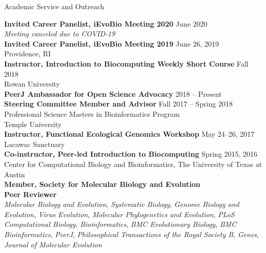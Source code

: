 \documentclass{resume} %
\begin{document}
\vspace*{0.5cm}

\vspace*{0.5cm}
\begin{rSection}{Academic Service and Outreach}
\vspace*{0.25cm}

\textbf{Invited Career Panelist, iEvoBio Meeting 2020} \hfill June 2020 \\ \emph{Meeting canceled due to COVID-19} \\

\textbf{Invited Career Panelist, iEvoBio Meeting 2019} \hfill June 26, 2019 \\ Providence, RI \\

\textbf{Instructor, Introduction to Biocomputing Weekly Short Course} \hfill Fall 2018 \\ Rowan University \\

\textbf{PeerJ Ambassador for Open Science Advocacy} \hfill 2018 -- Present \\

\textbf{Steering Committee Member and Advisor} \hfill Fall 2017 -- Spring 2018 \\ Professional Science Masters in Bioinformatics Program \\ Temple University \\

\textbf{Instructor, Functional Ecological Genomics Workshop} \hfill May 24--26, 2017 \\ Lacawac Sanctuary \\

\textbf{Co-instructor, Peer-led Introduction to Biocomputing} \hfill Spring 2015, 2016 \\ Center for Computational Biology and Bioinformatics, The University of Texas at Austin \\

\textbf{Member, Society for Molecular Biology and Evolution} \\

\textbf{Peer Reviewer} \\ \emph{Molecular Biology and Evolution}, \emph{Systematic Biology}, \emph{Genome Biology and Evolution}, \emph{Virus Evolution}, \emph{Molecular Phylogenetics and Evolution}, \emph{PLoS Computational Biology}, \emph{Bioinformatics}, \emph{BMC Evolutionary Biology},  \emph{BMC Bioinformatics}, \emph{PeerJ}, \emph{Philosophical Transactions of the Royal Society B}, \emph{Genes}, \emph{Journal of Molecular Evolution}

\end{rSection}
\vspace*{0.5cm}
\end{document}
